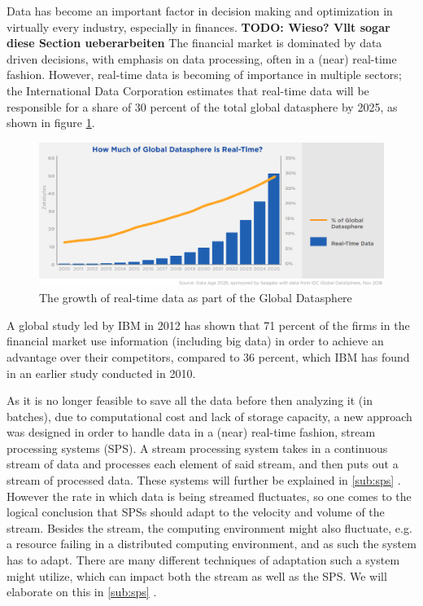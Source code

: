 Data has become an important factor in decision making and optimization in virtually every industry, especially in finances. \textbf{TODO: Wieso? Vllt sogar diese Section ueberarbeiten}
The financial market is dominated by data driven decisions, with emphasis on data processing, often in a (near) real-time fashion.
However, real-time data is becoming of importance in multiple sectors; the International Data Corporation estimates that real-time data will be 
responsible for a share of 30 percent of the total global datasphere by 2025, as shown in figure \ref{fig:growth_realtime_data}.
\begin{figure}[ht]
\centering
\includegraphics[width=1.0\textwidth]{Bilder/realtime_data.png}
\caption{The growth of real-time data as part of the Global Datasphere \cite[p.13]{idc-seagate-data}}
\label{fig:growth_realtime_data}
\end{figure}

A global study led by IBM in 2012 has shown that 71 percent of the firms in the financial market use information (including big data)
in order to achieve an advantage over their competitors, compared to 36 percent, which IBM has found in an earlier study conducted in 2010. \cite[p.1]{ibm-financial}

As it is no longer feasible to save all the data before then analyzing it (in batches), due to computational cost and lack of storage capacity, 
a new approach was designed in order to handle data in a (near) real-time fashion, stream processing systems (SPS). 
A stream processing system takes in a continuous stream of data and processes each element of said stream, and then puts out a stream of processed data.
These systems will further be explained in \ref{sub:sps} .
\\
However the rate in which data is being streamed fluctuates, so one comes to the logical conclusion that SPSs should adapt to the velocity and volume of the stream.
Besides the stream, the computing environment might also fluctuate, e.g. a resource failing in a distributed computing environment, 
and as such the system has to adapt. There are many different techniques of adaptation such a system might utilize, 
which can impact both the stream as well as the SPS. We will elaborate on this in \ref{sub:sps} .

